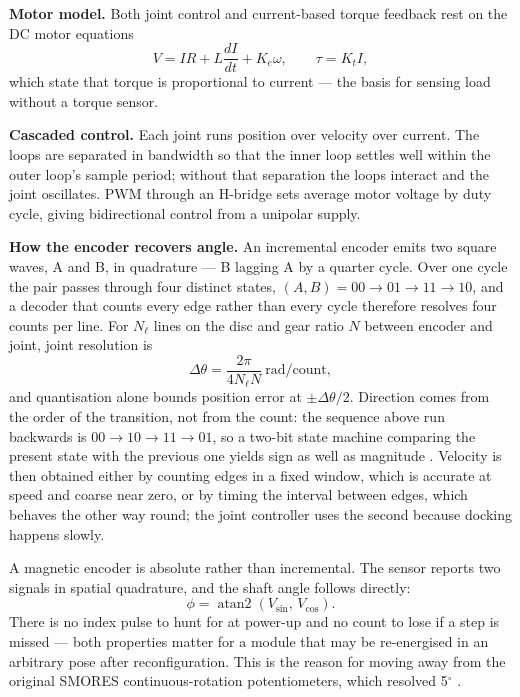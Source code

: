 \documentclass[11pt,a4paper]{article}
\newif\ifreview
\newcommand{\pending}[1]{\ifreview{\color{blue}#1}\else#1\fi}
\begin{document}
\pending{%
\noindent\textbf{Motor model.} Both joint control and current-based torque
feedback rest on the DC motor equations
\begin{equation}
  V = IR + L\frac{dI}{dt} + K_e\omega,
  \qquad
  \tau = K_t I ,
\end{equation}
which state that torque is proportional to current --- the basis for sensing
load without a torque sensor.

\noindent\textbf{Cascaded control.} Each joint runs position over velocity over
current. The loops are separated in bandwidth so that the inner loop settles
well within the outer loop's sample period; without that separation the loops
interact and the joint oscillates. PWM through an H-bridge sets average motor
voltage by duty cycle, giving bidirectional control from a unipolar supply.

\noindent\textbf{How the encoder recovers angle.} An incremental encoder emits
two square waves, A and B, in quadrature --- B lagging A by a quarter cycle.
Over one cycle the pair passes through four distinct states, $(A,B) =
00 \to 01 \to 11 \to 10$, and a decoder that counts every edge rather than
every cycle therefore resolves four counts per line. For $N_\ell$ lines on the
disc and gear ratio $N$ between encoder and joint, joint resolution is
\begin{equation}
  \Delta\theta = \frac{2\pi}{4 N_\ell N} \ \text{rad/count},
\end{equation}
and quantisation alone bounds position error at $\pm\Delta\theta/2$. Direction
comes from the order of the transition, not from the count: the sequence above
run backwards is $00 \to 10 \to 11 \to 01$, so a two-bit state machine
comparing the present state with the previous one yields sign as well as
magnitude \cite{alciatore2011}. Velocity is then obtained either by counting
edges in a fixed window, which is accurate at speed and coarse near zero, or by
timing the interval between edges, which behaves the other way round; the joint
controller uses the second because docking happens slowly.

A magnetic encoder is absolute rather than incremental. The sensor reports two
signals in spatial quadrature, and the shaft angle follows directly:
\begin{equation}
  \phi = \operatorname{atan2}\!\left(V_{\sin},\, V_{\cos}\right).
\end{equation}
There is no index pulse to hunt for at power-up and no count to lose if a step
is missed --- both properties matter for a module that may be re-energised in
an arbitrary pose after reconfiguration. This is the reason for moving away
from the original SMORES continuous-rotation potentiometers, which resolved
5$^\circ$ \cite{davey2012}.

}
\end{document}
